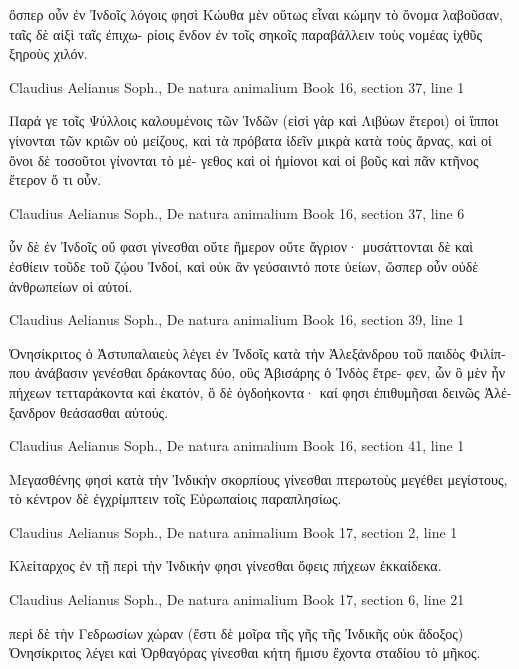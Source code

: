 \documentclass[12pt,letterpaper,twoside,final]{memoir}
\begin{document}
\begin{greek}
                                                      ὅσπερ   
οὖν ἐν Ἰνδοῖς λόγοις φησὶ Κώυθα μὲν οὕτως εἶναι 
κώμην τὸ ὄνομα λαβοῦσαν, ταῖς δὲ αἰξὶ ταῖς ἐπιχω-
ρίοις ἔνδον ἐν τοῖς σηκοῖς παραβάλλειν τοὺς νομέας 
ἰχθῦς ξηροὺς χιλόν. 



Claudius Aelianus Soph., De natura animalium 
Book 16, section 37, line 1

Παρά γε τοῖς Ψύλλοις καλουμένοις τῶν Ἰνδῶν 
(εἰσὶ γὰρ καὶ Λιβύων ἕτεροι) οἱ ἵπποι γίνονται τῶν 
κριῶν οὐ μείζους, καὶ τὰ πρόβατα ἰδεῖν μικρὰ κατὰ 
τοὺς ἄρνας, καὶ οἱ ὄνοι δὲ τοσοῦτοι γίνονται τὸ μέ-
γεθος καὶ οἱ ἡμίονοι καὶ οἱ βοῦς καὶ πᾶν κτῆνος 
ἕτερον ὅ τι οὖν. 



Claudius Aelianus Soph., De natura animalium 
Book 16, section 37, line 6

                       ὗν δὲ ἐν Ἰνδοῖς οὔ φασι γίνεσθαι 
οὔτε ἥμερον οὔτε ἄγριον· μυσάττονται δὲ καὶ ἐσθίειν 
τοῦδε τοῦ ζῴου Ἰνδοί, καὶ οὐκ ἂν γεύσαιντό ποτε 
ὑείων, ὥσπερ οὖν οὐδὲ ἀνθρωπείων οἱ αὐτοί. 



Claudius Aelianus Soph., De natura animalium 
Book 16, section 39, line 1

Ὀνησίκριτος ὁ Ἀστυπαλαιεὺς λέγει ἐν Ἰνδοῖς 
κατὰ τὴν Ἀλεξάνδρου τοῦ παιδὸς Φιλίππου ἀνάβασιν 
γενέσθαι δράκοντας δύο, οὓς Ἀβισάρης ὁ Ἰνδὸς ἔτρε-
φεν, ὧν ὃ μὲν ἦν πήχεων τετταράκοντα καὶ ἑκατόν, 
ὃ δὲ ὀγδοήκοντα· καί φησι ἐπιθυμῆσαι δεινῶς Ἀλέ-
ξανδρον θεάσασθαι αὐτούς. 



Claudius Aelianus Soph., De natura animalium 
Book 16, section 41, line 1

Μεγασθένης φησὶ κατὰ τὴν Ἰνδικὴν σκορπίους 
γίνεσθαι πτερωτοὺς μεγέθει μεγίστους, τὸ κέντρον 
δὲ ἐγχρίμπτειν τοῖς Εὐρωπαίοις παραπλησίως. 



Claudius Aelianus Soph., De natura animalium 
Book 17, section 2, line 1

Κλείταρχος ἐν τῇ περὶ τὴν Ἰνδικήν φησι γίνεσθαι 
ὄφεις πήχεων ἑκκαίδεκα. 



Claudius Aelianus Soph., De natura animalium 
Book 17, section 6, line 21

περὶ δὲ τὴν Γεδρωσίων χώραν (ἔστι δὲ μοῖρα τῆς 
γῆς τῆς Ἰνδικῆς οὐκ ἄδοξος) Ὀνησίκριτος λέγει καὶ 
Ὀρθαγόρας γίνεσθαι κήτη ἥμισυ ἔχοντα σταδίου τὸ 
μῆκος. 




\end{greek}
\end{document}
